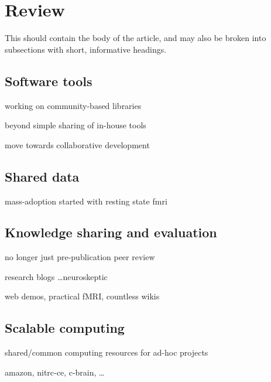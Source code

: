 \section{Review}

This should contain the body of the article, and may also be broken into subsections with short, informative headings.

\subsection{Software tools}

working on community-based libraries

beyond simple sharing of in-house tools

move towards collaborative development

\subsection{Shared data}

mass-adoption started with resting state fmri

\subsection{Knowledge sharing and evaluation}

no longer just pre-publication peer review

research blogs \ldots neuroskeptic

web demos, practical fMRI, countless wikis

\subsection{Scalable computing}

shared/common computing resources for ad-hoc projects

amazon, nitrc-ce, c-brain, \ldots


